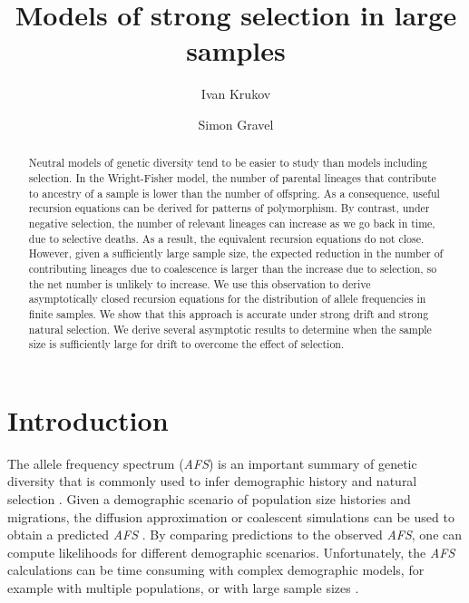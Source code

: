\documentclass[review]{elsarticle}
\begin{document}
\begin{frontmatter}
  \title{Models of strong selection in large samples}

  \author{Ivan Krukov}
  \author{Simon Gravel}

  \begin{abstract}
    
    Neutral models of genetic diversity tend to be easier to study than models including
    selection.
    In the Wright-Fisher model, the number of parental lineages that contribute to ancestry of 
    a sample is lower than the number of offspring.
    As a consequence, useful recursion equations can be derived for patterns of polymorphism. 
    By contrast, under negative
    selection, the number of relevant lineages can increase as we go back in time, due to selective
    deaths. As a result, the equivalent recursion equations do not close. However, given a
    sufficiently large sample size, the expected reduction in the number of contributing lineages
    due to coalescence is larger than the increase due to selection, so the net number is unlikely
    to increase. We use this observation to derive asymptotically closed recursion equations for the
    distribution of allele frequencies in finite samples. We show that this approach is accurate
    under strong drift and strong natural selection. We derive several asymptotic results to
    determine when the sample size is sufficiently large for drift to overcome the effect of
    selection.
  \end{abstract}

\end{frontmatter}

\section{Introduction}
\label{sec:introduciton}

The allele frequency spectrum (\textit{AFS}) is an important summary of genetic
diversity that is commonly used to infer demographic history and natural
selection \citep{}. Given a demographic scenario of population size histories
and migrations, the diffusion approximation or coalescent simulations can be
used to obtain a predicted \textit{AFS} \citep{}. By comparing predictions to
the observed \textit{AFS}, one can compute likelihoods for different
demographic scenarios. Unfortunately, the \textit{AFS} calculations can be time
consuming with complex demographic models, for example with multiple
populations, or with large sample sizes \citep{}.
\end{document}
